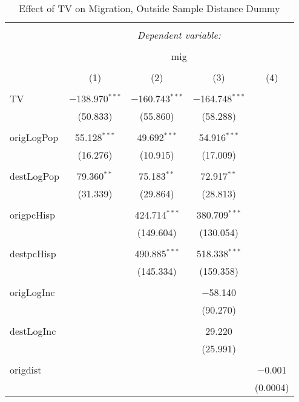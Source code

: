 
\begin{table}[!htbp] \centering 
  \caption{Effect of TV on Migration, Outside Sample Distance Dummy} 
  \label{} 
\begin{tabular}{@{\extracolsep{5pt}}lcccc} 
\\[-1.8ex]\hline 
\hline \\[-1.8ex] 
 & \multicolumn{4}{c}{\textit{Dependent variable:}} \\ 
\cline{2-5} 
\\[-1.8ex] & \multicolumn{4}{c}{mig} \\ 
\\[-1.8ex] & (1) & (2) & (3) & (4)\\ 
\hline \\[-1.8ex] 
 TV & $-$138.970$^{***}$ & $-$160.743$^{***}$ & $-$164.748$^{***}$ &  \\ 
  & (50.833) & (55.860) & (58.288) &  \\ 
  & & & & \\ 
 origLogPop & 55.128$^{***}$ & 49.692$^{***}$ & 54.916$^{***}$ &  \\ 
  & (16.276) & (10.915) & (17.009) &  \\ 
  & & & & \\ 
 destLogPop & 79.360$^{**}$ & 75.183$^{**}$ & 72.917$^{**}$ &  \\ 
  & (31.339) & (29.864) & (28.813) &  \\ 
  & & & & \\ 
 origpcHisp &  & 424.714$^{***}$ & 380.709$^{***}$ &  \\ 
  &  & (149.604) & (130.054) &  \\ 
  & & & & \\ 
 destpcHisp &  & 490.885$^{***}$ & 518.338$^{***}$ &  \\ 
  &  & (145.334) & (159.358) &  \\ 
  & & & & \\ 
 origLogInc &  &  & $-$58.140 &  \\ 
  &  &  & (90.270) &  \\ 
  & & & & \\ 
 destLogInc &  &  & 29.220 &  \\ 
  &  &  & (25.991) &  \\ 
  & & & & \\ 
 origdist &  &  &  & $-$0.001 \\ 
  &  &  &  & (0.0004) \\ 

\end{tabular}
\end{table}
